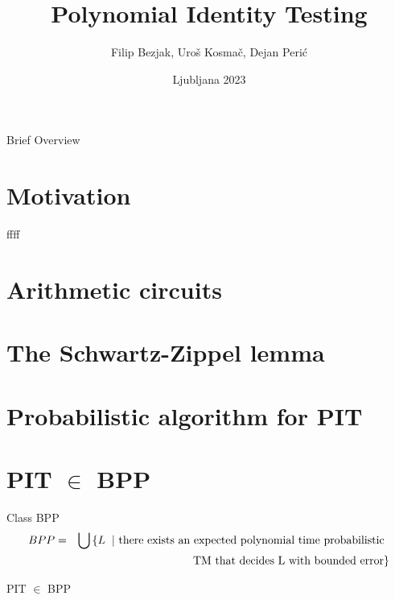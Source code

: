 \documentclass{beamer}
\title{Polynomial Identity Testing}
\author{Filip Bezjak, Uroš Kosmač, Dejan Perić}
\date{Ljubljana 2023}
\begin{document}
\begin{frame}
	\maketitle
\end{frame}


 \begin{frame}{Brief Overview}
	\tableofcontents
\end{frame}

\section{Motivation}
ffff


\section{Arithmetic circuits}





\section{The Schwartz-Zippel lemma}



\section{Probabilistic algorithm for PIT}


\section{PIT $\in$ BPP}


\begin{frame}{Class BPP}
	\begin{eqnarray*}BPP &=& \bigcup \left\{ L \hspace{2mm}| \text{ there exists an expected polynomial time probabilistic }  \right. \\  & & \left. \hspace{5mm} \text{TM that decides L with bounded error} \right\} \end{eqnarray*}
\end{frame}

\begin{frame}{PIT $\in$ BPP}
	

\end{frame}

\end{document}

